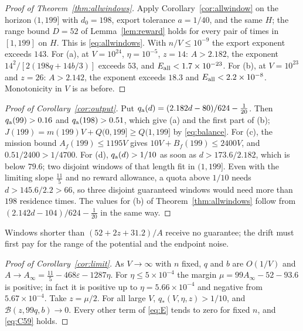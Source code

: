 \documentclass[11pt,letterpaper]{article}
\theoremstyle{plain}
\theoremstyle{definition}
\theoremstyle{remark}
\numberwithin{equation}{section}
\newcommand{\cB}{\mathcal B}
\newcommand{\eps}{\varepsilon}
\begin{document}
\begin{proof}[Proof of Theorem~\ref{thm:allwindows}]
Apply Corollary~\ref{cor:allwindow} on the horizon $(1,199]$ with $d_0=198$, export tolerance $a=1/40$, and the same $H$; the range bound $D=52$ of Lemma~\ref{lem:reward} holds for every pair of times in $[1,199]$ on $H$. This is \eqref{eq:allwindows}. With $n/V\le10^{-9}$ the export exponent exceeds $143$. For (a), at $V=10^{24}$, $\eta=10^{-5}$, $z=14$: $A>2.182$, the exponent $14^2/[2(198q+14b/3)]$ exceeds $53$, and $E_{\rm all}<1.7\times10^{-23}$. For (b), at $V=10^{23}$ and $z=26$: $A>2.142$, the exponent exceeds $18.3$ and $E_{\rm all}<2.2\times10^{-8}$. Monotonicity in $V$ is as before.
\end{proof}

\begin{proof}[Proof of Corollary~\ref{cor:output}]
Put $q_{\rm a}(d)=(2.182d-80)/624-\frac1{20}$. Then $q_{\rm a}(99)>0.16$ and $q_{\rm a}(198)>0.51$, which give (a) and the first part of (b); $J(199)=m(199)V+Q(0,199]\ge Q(1,199]$ by \eqref{eq:balance}. For (c), the mission bound $A_f(199)\le1195V$ gives $10V+B_f(199)\le2400V$, and $0.51/2400>1/4700$. For (d), $q_{\rm a}(d)>1/10$ as soon as $d>173.6/2.182$, which is below $79.6$; two disjoint windows of that length fit in $(1,199]$. Even with the limiting slope $\frac{11}5$ and no reward allowance, a quota above $1/10$ needs $d>145.6/2.2>66$, so three disjoint guaranteed windows would need more than $198$ residence times. The values for (b) of Theorem~\ref{thm:allwindows} follow from $(2.142d-104)/624-\frac1{20}$ in the same way.
\end{proof}
Windows shorter than $(52+2z+31.2)/A$ receive no guarantee; the drift must first pay for the range of the potential and the endpoint noise.

\begin{proof}[Proof of Corollary~\ref{cor:limit}]
As $V\to\infty$ with $n$ fixed, $q$ and $b$ are $O(1/V)$ and $A\to A_\infty=\frac{11}5-468\eps-1287\eta$. For $\eta\le5\times10^{-4}$ the margin $\mu=99A_\infty-52-93.6$ is positive; in fact it is positive up to $\eta=5.66\times10^{-4}$ and negative from $5.67\times10^{-4}$. Take $z=\mu/2$. For all large $V$, $q_*(V,\eta,z)>1/10$, and $\cB(z,99q,b)\to0$. Every other term of \eqref{eq:E} tends to zero for fixed $n$, and \eqref{eq:C59} holds.
\end{proof}
\end{document}
